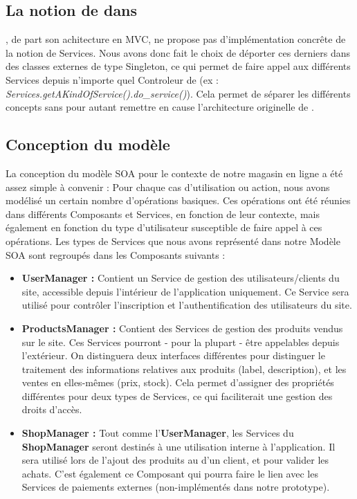 \subsection{La notion de \kwsoa{} dans \kwplay{}}

\kwplay{}, de part son achitecture en MVC, ne propose pas d'implémentation concrête de la notion de Services. 
Nous avons donc fait le choix de déporter ces derniers dans des classes externes de type Singleton, ce qui permet de faire appel aux différents Services depuis n'importe quel Controleur de \kwplay{} (ex : \textit{Services.getAKindOfService().do\_service()}). 
Cela permet de séparer les différents concepts sans pour autant remettre en cause l'architecture originelle de \kwplay{}.

\subsection{Conception du modèle}

La conception du modèle SOA pour le contexte de notre magasin en ligne a été assez simple à convenir : Pour chaque cas d'utilisation ou action, nous avons modélisé un certain nombre d'opérations basiques. Ces opérations ont été réunies dans différents Composants et Services, en fonction de leur contexte, mais également en fonction du type d'utilisateur susceptible de faire appel à ces opérations.
Les types de Services que nous avons représenté dans notre Modèle SOA sont regroupés dans les Composants suivants :
\begin{itemize}
\item \textbf{UserManager :} Contient un Service de gestion des utilisateurs/clients du site, accessible depuis l'intérieur de l'application uniquement. Ce Service sera utilisé pour contrôler l'inscription et l'authentification des utilisateurs du site.
\item \textbf{ProductsManager :} Contient des Services de gestion des produits vendus sur le site. Ces Services pourront - pour la plupart - être appelables depuis l'extérieur. On distinguera deux interfaces différentes pour distinguer le traitement des informations relatives aux produits (label, description), et les ventes en elles-mêmes (prix, stock). Cela permet d'assigner des propriétés différentes pour deux types de Services, ce qui faciliterait une gestion des droits d'accès.
\item \textbf{ShopManager :} Tout comme l'\textbf{UserManager}, les Services du \textbf{ShopManager} seront destinés à une utilisation interne à l'application. Il sera utilisé lors de l'ajout des produits au  d'un client, et pour valider les achats. C'est également ce Composant qui pourra faire le lien avec les Services de paiements externes (non-implémentés dans notre prototype).
\end{itemize}

